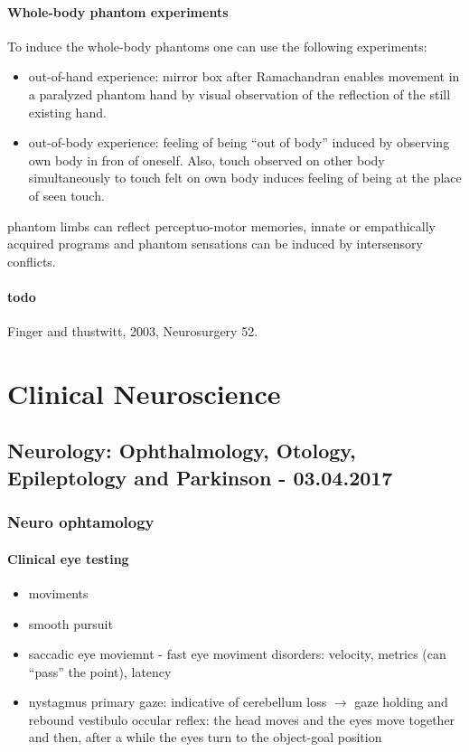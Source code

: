 \documentclass[12pt,article,oneside,a4paper]{memoir}
\begin{document}
\paragraph{Whole-body phantom experiments}
To induce the whole-body phantoms one can use the following experiments:
\begin{itemize}
\item out-of-hand experience: mirror box after Ramachandran enables movement in a
paralyzed phantom hand by visual observation of the reflection of the still
existing hand.
\item out-of-body experience: feeling of being ``out of body'' induced by
observing own body in fron of oneself. Also, touch observed on other body
simultaneously to touch felt on own body induces feeling of being at the place
of seen touch.
\end{itemize}

phantom limbs can reflect perceptuo-motor memories, innate or empathically
acquired programs and phantom sensations can be induced by intersensory conflicts.

\paragraph{todo} Finger and thustwitt, 2003, Neurosurgery 52.

\newpage
\section{Clinical Neuroscience}

\subsection{Neurology: Ophthalmology, Otology, Epileptology and Parkinson - 03.04.2017}
\subsubsection{Neuro ophtamology}
\paragraph{Clinical eye testing}  
\begin{itemize}
\item moviments
\item smooth pursuit
\item saccadic eye moviemnt - fast eye moviment
\subitem disorders: velocity, metrics (can ``pass'' the point), latency
\item nystagmus
\subitem primary gaze: indicative of cerebellum loss $\rightarrow$ gaze holding and rebound
\subitem vestibulo occular reflex: the head moves and the eyes move together and then, after a while the eyes turn to the object-goal position
\end{itemize}
\end{document}
